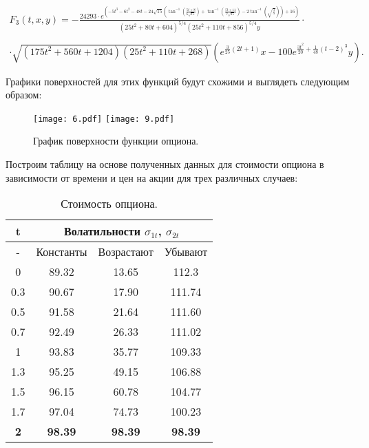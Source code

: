\documentclass[a4paper, 12pt]{extreport}
\numberwithin{equation}{section}
\begin{document}
	\begin{multline*}
	{F_3}({t},{x},{y})=-\frac{24293 \cdot e^{\left(-5 t^3-6 t^2-48 t-24 \sqrt{15} \left(\tan ^{-1}\left(\frac{5 t+8}{6 \sqrt{15}}\right)+\tan ^{-1}\left(\frac{5 t+11}{7 \sqrt{15}}\right)-2 \tan ^{-1}\left(\sqrt{\frac{3}{5}}\right)\right)+16\right)}}{\left(25 t^2+80 t+604\right)^{5/4} \left(25 t^2+110 t+856\right)^{5/4} y} \cdot \\ \\  \cdot
	\sqrt{\left(175 t^2+560 t+1204\right) \left(25 t^2+110 t+268\right)} \left(e^{\frac{3}{25} (2 t+1)} x-100 e^{\frac{3 t^2}{20}+\frac{1}{48} (t-2)^3} y\right) .
	\end{multline*}
	


	Графики поверхностей для этих функций будут схожими и выглядеть следующим образом: 



\begin{figure}[h]
	\begin{center}
		\texttt{[image: 6.pdf]}
		\texttt{[image: 9.pdf]}
		\caption{График поверхности функции опциона.}
	\end{center}
\end{figure}



	
	Построим таблицу на основе полученных данных для стоимости опциона в зависимости от времени и цен на акции для трех различных случаев:
	
	
	\renewcommand{\arraystretch}{1.4}
	\renewcommand{\tabcolsep}{1cm}
	
	\begin{table}[H]
	\begin{center}
		\begin{tabular}{|c|c|c|c|}
		\hline
		t & \multicolumn{3}{|c|}{Волатильности $\sigma_{1t}$, $\sigma_{2t}$ }\\
		\hline
		- & Константы & Возрастают & Убывают \\
		\hline
		0 & 89.32 & 13.65 & 112.3 \\
		\hline
		0.3 & 90.67 & 17.90 & 111.74  \\
		\hline
		0.5 & 91.58 & 21.64 & 111.60 \\
		\hline
		0.7 & 92.49 & 26.33 & 111.02\\
		\hline
		1 & 93.83 & 35.77 & 109.33 \\
		\hline
		1.3 & 95.25 & 49.15 & 106.88 \\
		\hline
		1.5 & 96.15 & 60.78 & 104.77 \\
		\hline
		1.7 & 97.04 & 74.73 & 100.23 \\
		\hline
		\textbf{2} & \textbf{98.39} & \textbf{98.39} & \textbf{98.39} \\
		\hline
	\end{tabular}
\caption{Стоимость опциона.}
\end{center}
\end{table}
\end{document}
